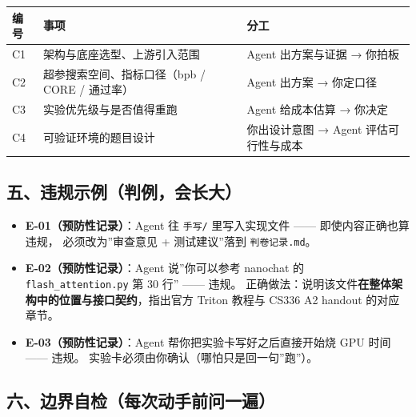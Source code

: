 \documentclass[
  chinese,
  11pt,
]{ctexart}
\newcounter{none} %
\providecommand{\tightlist}{%
  \setlength{\itemsep}{0pt}\setlength{\parskip}{0pt}}
\begin{document}
{\def\LTcaptype{none} %
\begin{longtable}[]{@{}
  >{\raggedright\arraybackslash}p{}
  >{\raggedright\arraybackslash}p{}
  >{\raggedright\arraybackslash}p{}@{}}
\toprule\noalign{}
\begin{minipage}[b]{\linewidth}\raggedright
编号
\end{minipage} & \begin{minipage}[b]{\linewidth}\raggedright
事项
\end{minipage} & \begin{minipage}[b]{\linewidth}\raggedright
分工
\end{minipage} \\
\midrule\noalign{}
\endhead
\bottomrule\noalign{}
\endlastfoot
C1 & 架构与底座选型、上游引入范围 & Agent 出方案与证据 → 你拍板 \\
C2 & 超参搜索空间、指标口径（bpb / CORE / 通过率） & Agent 出方案 → 你定口径 \\
C3 & 实验优先级与是否值得重跑 & Agent 给成本估算 → 你决定 \\
C4 & 可验证环境的题目设计 & 你出设计意图 → Agent 评估可行性与成本 \\
\end{longtable}
}

\subsection{五、违规示例（判例，会长大）}\label{ux4e94ux8fddux89c4ux793aux4f8bux5224ux4f8bux4f1aux957fux5927}

\begin{itemize}
\tightlist
\item
  \textbf{E-01（预防性记录）}：Agent 往 \texttt{手写/} 里写入实现文件 ------ 即使内容正确也算违规， 必须改为''审查意见 + 测试建议''落到 \texttt{判卷记录.md}。
\item
  \textbf{E-02（预防性记录）}：Agent 说''你可以参考 nanochat 的 \texttt{flash\_attention.py} 第 30 行'' ------ 违规。 正确做法：说明该文件\textbf{在整体架构中的位置与接口契约}，指出官方 Triton 教程与 CS336 A2 handout 的对应章节。
\item
  \textbf{E-03（预防性记录）}：Agent 帮你把实验卡写好之后直接开始烧 GPU 时间 ------ 违规。 实验卡必须由你确认（哪怕只是回一句''跑''）。
\end{itemize}

\subsection{六、边界自检（每次动手前问一遍）}\label{ux516dux8fb9ux754cux81eaux68c0ux6bcfux6b21ux52a8ux624bux524dux95eeux4e00ux904d}
\end{document}
